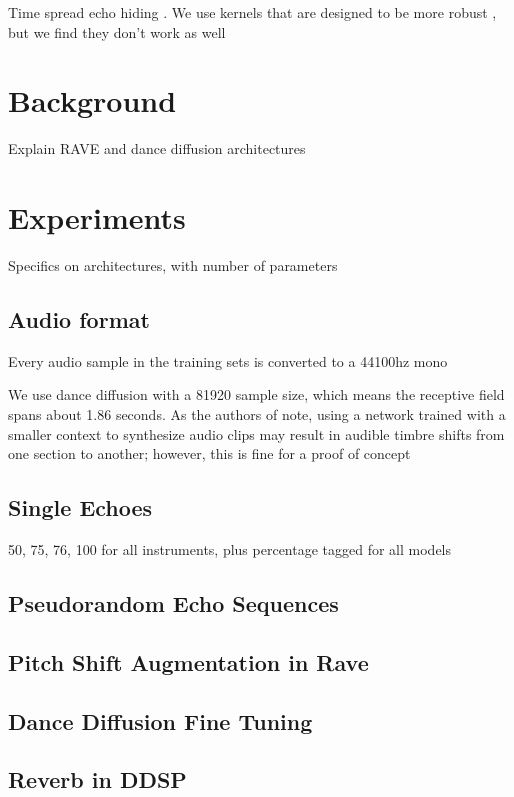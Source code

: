 \documentclass[lettersize,journal]{IEEEtran}
\begin{document}
Time spread echo hiding \cite{ko2005time}.  We use kernels that are designed to be more robust \cite{xiang2010effective}, but we find they don't work as well


\section{Background}

Explain RAVE and dance diffusion architectures

\section{Experiments}

Specifics on architectures, with number of parameters

\subsection{Audio format}
Every audio sample in the training sets is converted to a 44100hz mono 

We use dance diffusion with a 81920 sample size, which means the receptive field spans about 1.86 seconds.  As the authors of \cite{hawthornemulti} note, using a network trained with a smaller context to synthesize audio clips may result in audible timbre shifts from one section to another; however, this is fine for a proof of concept

\subsection{Single Echoes}

50, 75, 76, 100 for all instruments, plus percentage tagged for all models

\subsection{Pseudorandom Echo Sequences}


\subsection{Pitch Shift Augmentation in Rave}


\subsection{Dance Diffusion Fine Tuning}


\subsection{Reverb in DDSP}
\end{document}
